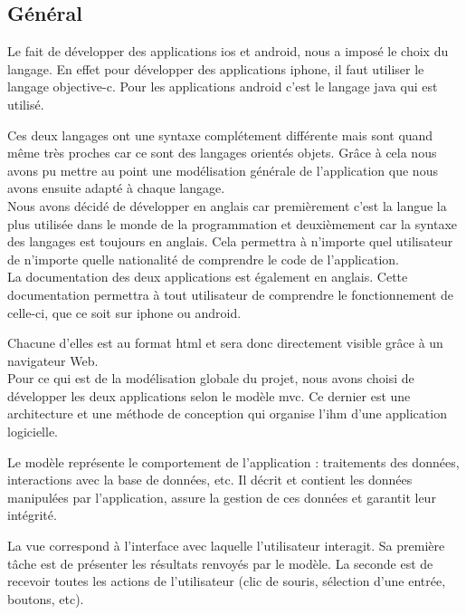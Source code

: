 \subsection{Général}
	Le fait de développer des applications \gls{ios} et \gls{android}, nous a 
	imposé le choix du langage.
	En effet pour développer des applications \gls{iphone}, il faut utiliser 
	le langage \gls{objective-c}.
	Pour les applications \gls{android} c'est le langage \gls{java} qui est 
	utilisé.
	
	Ces deux langages ont une syntaxe complétement différente mais sont quand 
	même très proches car ce sont des langages orientés objets.
	Grâce à cela nous avons pu mettre au point une modélisation générale de 
	l'application que nous avons ensuite adapté à chaque langage.\\
			
	Nous avons décidé de développer en anglais car premièrement c'est la langue
	la plus utilisée dans le monde de la programmation et deuxièmement car la 
	syntaxe des langages est toujours en anglais.
	Cela permettra à n'importe quel utilisateur de n'importe quelle nationalité 
	de comprendre le code de l'application.\\
			
	La documentation des deux applications est également en anglais.
	Cette documentation permettra à tout utilisateur de comprendre le 
	fonctionnement de celle-ci, que ce soit sur \gls{iphone} ou \gls{android}.
	
	Chacune d'elles est au format \gls{html} et sera donc directement visible 
	grâce à un navigateur Web.\\
			
	Pour ce qui est de la modélisation globale du projet, nous avons choisi de 
	développer les deux applications selon le modèle \gls{mvc}.
	Ce dernier est une architecture et une méthode de conception qui organise 
	l'\gls{ihm} d'une application logicielle. 
			
	Le modèle représente le comportement de l'application : traitements des
	 données, interactions avec la base de données, etc.
	Il décrit et contient les données manipulées par l'application, assure 
	la gestion de ces données et garantit leur intégrité.
			
	La vue correspond à l'interface avec laquelle l'utilisateur interagit.
	Sa première tâche est de présenter les résultats renvoyés par le modèle.
	La seconde est de recevoir toutes les actions de l'utilisateur 
	(clic de souris, sélection d'une entrée, boutons, etc).
			
